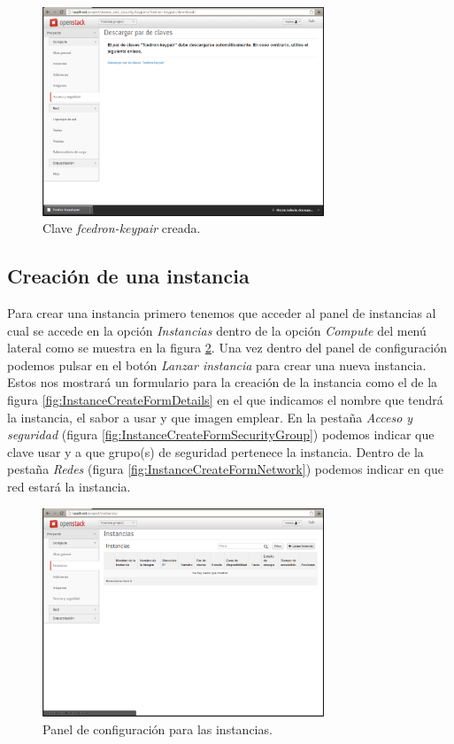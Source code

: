 \documentclass{article}
\begin{document}
\begin{figure}[h]
  \centering
    \includegraphics[width=0.75\textwidth]{img/m_036.png}
  \caption{Clave \emph{fcedron-keypair} creada.}
  \label{fig:PairKeyCreate}
\end{figure}	


\clearpage
\subsection{Creación de una instancia}
	Para crear una instancia primero tenemos que acceder al panel de instancias al cual se accede en la opción \emph{Instancias} dentro de la opción \emph{Compute} del menú lateral como se muestra en la figura \ref{fig:InstanceInit}. Una vez dentro del panel de configuración podemos pulsar en el botón \emph{Lanzar instancia} para crear una nueva instancia. Estos nos mostrará un formulario para la creación de la instancia como el de la figura \ref{fig:InstanceCreateFormDetails} en el que indicamos el nombre que tendrá la instancia, el sabor a usar y que imagen emplear. En la pestaña \emph{Acceso y seguridad} (figura \ref{fig:InstanceCreateFormSecurityGroup}) podemos indicar que clave usar y a que grupo(s) de seguridad pertenece la instancia. Dentro de la pestaña \emph{Redes} (figura \ref{fig:InstanceCreateFormNetwork}) podemos indicar en que red estará la instancia.

\begin{figure}[h]
  \centering
    \includegraphics[width=0.75\textwidth]{img/m_037.png}
  \caption{Panel de configuración para las instancias.}
  \label{fig:InstanceInit}
\end{figure}	
\end{document}
